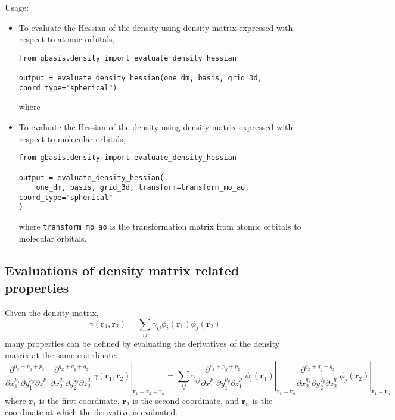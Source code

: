 \documentclass[letterpaper]{article}
\begin{document}
Usage:
\begin{itemize}
\item To evaluate the Hessian of the density using density matrix expressed
  with respect to atomic orbitals,
\begin{verbatim}
from gbasis.density import evaluate_density_hessian

output = evaluate_density_hessian(one_dm, basis, grid_3d, coord_type="spherical")
\end{verbatim}
  where
\item To evaluate the Hessian of the density using density matrix expressed
  with respect to molecular orbitals,
\begin{verbatim}
from gbasis.density import evaluate_density_hessian

output = evaluate_density_hessian(
    one_dm, basis, grid_3d, transform=transform_mo_ao, coord_type="spherical"
)
\end{verbatim}
  where
  \verb|transform_mo_ao| is the transformation matrix from atomic orbitals
  to molecular orbitals.
\end{itemize}
\subsection{Evaluations of density matrix related properties}
Given the density matrix,
\begin{equation}
  \gamma(\mathbf{r}_1, \mathbf{r}_2)
  = \sum_{ij} \gamma_{ij} \phi_i(\mathbf{r}_1) \phi_j(\mathbf{r}_2)
\end{equation}
many properties can be defined by evaluating the derivatives of the density
matrix at the same coordinate:
\begin{equation}
  \left.
    \frac{\partial^{p_x + p_y + p_z}}{\partial x_1^{p_x} \partial y_1^{p_y} \partial z_1^{p_z}}
    \frac{\partial^{q_x + q_y + q_z}}{\partial x_2^{q_x} \partial y_2^{q_y} \partial z_2^{q_z}}
    \gamma(\mathbf{r}_1, \mathbf{r}_2)
  \right|_{\mathbf{r}_1 = \mathbf{r}_2 = \mathbf{r}_n} =
  \sum_{ij} \gamma_{ij}
  \left.
    \frac{\partial^{p_x + p_y + p_z}}{\partial x_1^{p_x} \partial y_1^{p_y} \partial z_1^{p_z}}
    \phi_i(\mathbf{r}_1)
  \right|_{\mathbf{r}_1 = \mathbf{r}_n}
  \left.
    \frac{\partial^{q_x + q_y + q_z}}{\partial x_2^{q_x} \partial y_2^{q_y} \partial z_2^{q_z}}
    \phi_j(\mathbf{r}_2)
  \right|_{\mathbf{r}_1 = \mathbf{r}_n}
\end{equation}
where $\mathbf{r}_1$ is the first coordinate, $\mathbf{r}_2$ is the second
coordinate, and $\mathbf{r}_n$ is the coordinate at which the derivative is
evaluated.
\end{document}
